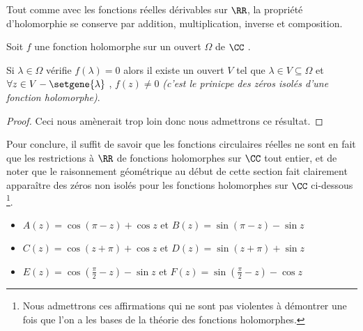 \medskip

Tout comme avec les fonctions réelles dérivables sur $\RR$, la propriété d'holomorphie se conserve par addition, multiplication, inverse et composition.


\medskip

\begin{fact} \label{holo-nullity}
	Soit $f$ une fonction holomorphe sur un ouvert $\Omega$ de $\CC$ . 
	
	\smallskip
	
	Si $\lambda \in \Omega$ vérifie $f(\lambda) = 0$ alors il existe un ouvert $V$ tel que $\lambda \in V \subseteq \Omega$ et $\forall z \in V - \setgene{\lambda}$ , $f(z) \neq 0$ 
	\emph{(c'est le prinicpe des zéros isolés d'une fonction holomorphe)}. 
\end{fact}


\begin{proof}
	Ceci nous amènerait trop loin donc nous admettrons ce résultat.
\end{proof}


\medskip

Pour conclure, il suffit de savoir que les fonctions circulaires réelles ne sont en fait que les restrictions à $\RR$ de fonctions holomorphes sur $\CC$ tout entier, et de noter que le raisonnement géométrique au début de cette section fait clairement apparaître des zéros non isolés pour les fonctions holomorphes sur $\CC$ ci-dessous
\footnote{
	Nous admettrons ces affirmations qui ne sont pas violentes à démontrer une fois que l'on a les bases de la théorie des fonctions holomorphes.
}.

\begin{itemize}[label=\small\textbullet]
	\item $A(z) = \cos (\pi - z) + \cos z$ 
	   et $B(z) =\sin (\pi - z) - \sin z$ 

	\smallskip
	\item $C(z) =\cos (z + \pi) + \cos z$ 
	   et $D(z) =\sin (z + \pi) + \sin z$

	\smallskip
	\item $E(z) =\cos \left( \frac{\pi}{2} - z \right) - \sin z$ 
	   et $F(z) =\sin \left( \frac{\pi}{2} - z \right) - \cos z$ 
\end{itemize}

